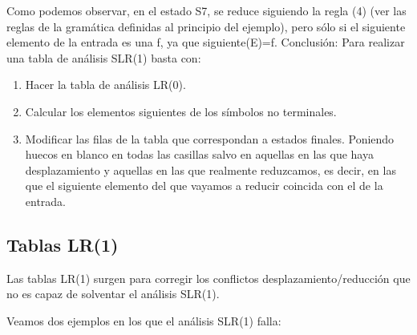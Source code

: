 \documentclass{apuntes}
\begin{document}
Como podemos observar, en el estado S7, se reduce siguiendo la regla (4) (ver las reglas de la gramática definidas al principio del ejemplo), pero sólo si el siguiente elemento de la entrada es una f, ya que siguiente(E)={f}.
\newpage
Conclusión: Para realizar una tabla de análisis SLR(1) basta con:
\begin{enumerate}
\item Hacer la tabla de análisis LR(0).
\item Calcular los elementos siguientes de los símbolos no terminales.
\item Modificar las filas de la tabla que correspondan a estados finales. Poniendo huecos en blanco en todas las casillas salvo en aquellas en las que haya desplazamiento y aquellas en las que realmente reduzcamos, es decir, en las que el siguiente elemento del que vayamos a reducir coincida con el de la entrada.
\end{enumerate}


\subsection{Tablas LR(1)}
Las tablas LR(1) surgen para corregir los conflictos desplazamiento/reducción que no es capaz de solventar el análisis SLR(1).

Veamos dos ejemplos en los que el análisis SLR(1) falla:
\end{document}
